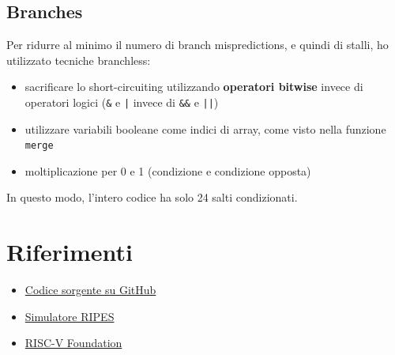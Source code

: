 \documentclass[a4paper,12pt]{article}
\begin{document}
\subsection{Branches}

Per ridurre al minimo il numero di branch mispredictions, e quindi di stalli, ho utilizzato tecniche branchless:

\begin{itemize}
  \item sacrificare lo short-circuiting utilizzando \textbf{operatori bitwise} invece di operatori logici (\texttt{\&} e \texttt{|} invece di \texttt{\&\&} e \texttt{||})
  \item utilizzare variabili booleane come indici di array, come visto nella funzione \texttt{merge}
  \item moltiplicazione per 0 e 1 (condizione e condizione opposta)
\end{itemize}

In questo modo, l'intero codice ha solo 24 salti condizionati.

\section{Riferimenti}

\begin{itemize}
    \item \href{https://github.com/Raimo33/LinkedList}{Codice sorgente su GitHub}
    \item \href{https://github.com/mortbopet/Ripes}{Simulatore RIPES}
    \item \href{https://riscv.org/}{RISC-V Foundation}
\end{itemize}
\end{document}
